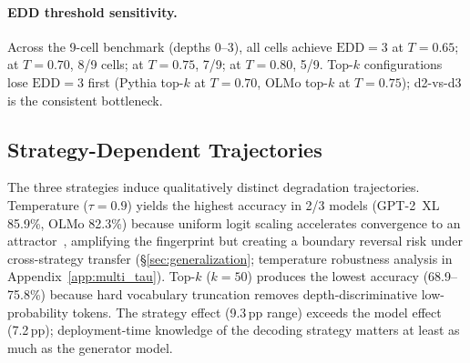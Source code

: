 \paragraph{EDD threshold sensitivity.}
Across the 9-cell benchmark (depths 0--3), all cells achieve $\mathrm{EDD}{=}3$ at $T{=}0.65$; at $T{=}0.70$, 8/9 cells; at $T{=}0.75$, 7/9; at $T{=}0.80$, 5/9.
Top-$k$ configurations lose $\mathrm{EDD}{=}3$ first (Pythia top-$k$ at $T{=}0.70$, OLMo top-$k$ at $T{=}0.75$); d2-vs-d3 is the consistent bottleneck.

\subsection{Strategy-Dependent Trajectories}
\label{sec:atlas:strategy}

The three strategies induce qualitatively distinct degradation trajectories.
Temperature ($\tau{=}0.9$) yields the highest accuracy in 2/3 models (GPT-2~XL 85.9\%, OLMo 82.3\%) because uniform logit scaling accelerates convergence to an attractor~\cite{shumailov2024_nature}, amplifying the fingerprint but creating a boundary reversal risk under cross-strategy transfer (\S\ref{sec:generalization}; temperature robustness analysis in Appendix~\ref{app:multi_tau}).
Top-$k$ ($k{=}50$) produces the lowest accuracy (68.9--75.8\%) because hard vocabulary truncation removes depth-discriminative low-probability tokens.
The strategy effect (9.3\,pp range) exceeds the model effect (7.2\,pp); deployment-time knowledge of the decoding strategy matters at least as much as the generator model.
